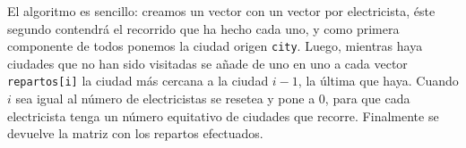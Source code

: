 \documentclass[12pt]{article}
\begin{document}
\begin{itemize}[wide, nosep, labelindent = 0pt, topsep = 1ex]
El algoritmo es sencillo: creamos un vector con un vector por electricista, éste segundo contendrá el recorrido que ha hecho cada uno, y como primera componente de todos ponemos la ciudad origen \verb|city|. Luego, mientras haya ciudades que no han sido visitadas se añade de uno en uno a cada vector \verb|repartos[i]| la ciudad más cercana a la ciudad $i-1$, la última que haya. Cuando $i$ sea igual al número de electricistas se resetea y pone a 0, para que cada electricista tenga un número equitativo de ciudades que recorre. Finalmente se devuelve la matriz con los repartos efectuados. 
\end{itemize}
\end{document}
